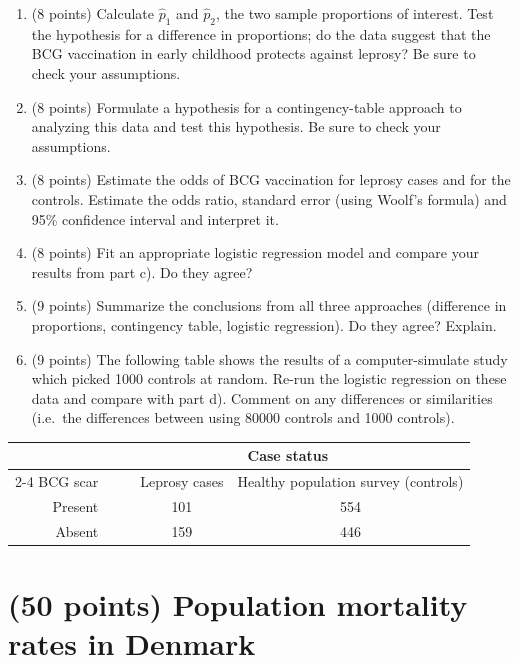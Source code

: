 \documentclass[letterpaper,12pt,twoside,]{pinp}
\begin{document}
\begin{enumerate}
\def\labelenumi{\alph{enumi})}
\item
  (8 points) Calculate \(\hat{p}_1\) and \(\hat{p}_2\), the two sample
  proportions of interest. Test the hypothesis for a difference in
  proportions; do the data suggest that the BCG vaccination in early
  childhood protects against leprosy? Be sure to check your assumptions.
\item
  (8 points) Formulate a hypothesis for a contingency-table approach to
  analyzing this data and test this hypothesis. Be sure to check your
  assumptions.
\item
  (8 points) Estimate the odds of BCG vaccination for leprosy cases and
  for the controls. Estimate the odds ratio, standard error (using
  Woolf's formula) and 95\% confidence interval and interpret it.
\item
  (8 points) Fit an appropriate logistic regression model and compare
  your results from part c). Do they agree?
\item
  (9 points) Summarize the conclusions from all three approaches
  (difference in proportions, contingency table, logistic regression).
  Do they agree? Explain.
\item
  (9 points) The following table shows the results of a
  computer-simulate study which picked 1000 controls at random. Re-run
  the logistic regression on these data and compare with part d).
  Comment on any differences or similarities (i.e.~the differences
  between using 80000 controls and 1000 controls).
\end{enumerate}

\begin{table}[h]
    \centering
    \begin{tabular}{rrcc}
        & \multicolumn{3}{c}{Case status} \\
        \cline{2-4}
        BCG scar & \ \hspace{3mm}\ & Leprosy cases & Healthy population survey (controls) \\
        \hline
        Present && 101 & 554 \\
        Absent && 159 & 446 \\
        \hline
    \end{tabular}
\end{table}

\hypertarget{points-population-mortality-rates-in-denmark}{%
\section{(50 points) Population mortality rates in
Denmark}\label{points-population-mortality-rates-in-denmark}}
\end{document}
